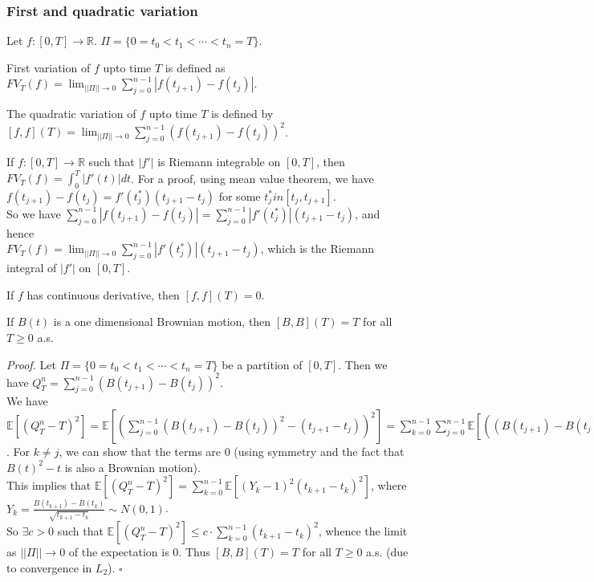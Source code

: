 \documentclass[a4paper]{article}
\newenvironment{proof}{\begin{breakbox}\textit{Proof.}}{\hfill$\square$\end{breakbox}}
\newcommand{\nl}{\vspace{0.2cm}\\}
\newcommand{\R}{\mathbb{R}}
\newcommand{\E}{\mathbb{E}}
\begin{document}
\subsubsection{First and quadratic variation}
Let $f : [0, T] \to \R$. $\Pi = \{0 = t_0 < t_1 < \cdots < t_n = T\}$.\nl
\begin{defn}
    First variation of $f$ upto time $T$ is defined as 
    $FV_T(f) = \lim_{||\Pi|| \to 0} \sum_{j = 0}^{n - 1} |f(t_{j+1}) - f(t_j)|$.
\end{defn}
\begin{defn}
    The quadratic variation of $f$ upto time $T$ is defined by
    $[f, f](T) = \lim_{||\Pi|| \to 0} \sum_{j = 0}^{n - 1} (f(t_{j+1}) - f(t_j))^2$.
\end{defn}
\begin{note}
    If $f : [0, T] \to \R$ such that $|f'|$ is Riemann integrable on $[0, T]$, then $FV_T(f) = \int_0^T |f'(t)| dt$. For a proof, using mean value theorem, we have $f(t_{j+1}) - f(t_j) =
    f'(t_j^*)(t_{j+1} - t_j)$ for some $t_j^* in [t_j, t_{j+1}]$.\nl
    So we have $\sum_{j = 0}^{n - 1} |f(t_{j+1}) - f(t_j)| = \sum_{j = 0}^{n - 1} |f'(t_j^*)| (t_{j+1} - t_j)$, and hence\nl
    $FV_T(f) = \lim_{||\Pi|| \to 0} \sum_{j=0}^{n-1} |f'(t_j^*)| (t_{j+1} - t_j)$, which is the Riemann integral of $|f'|$ on $[0, T]$.
\end{note}
\begin{note}
    If $f$ has continuous derivative, then $[f, f](T) = 0$.
\end{note}

\begin{theorem}
    If $B(t)$ is a one dimensional Brownian motion, then $[B, B](T) = T$ for all $T \ge 0$ a.s.
\end{theorem}
\begin{proof}
    Let $\Pi = \{0 = t_0 < t_1 < \cdots < t_n = T\}$ be a partition of $[0, T]$. Then we have $Q_T^n = \sum_{j=0}^{n-1} (B(t_{j+1}) - B(t_j))^2$.\nl
    We have $\E[(Q_T^n - T)^2] = \E[(\sum_{j=0}^{n-1} (B(t_{j+1}) - B(t_j))^2 - (t_{j+1} - t_j))^2] = \sum_{k=0}^{n-1} \sum_{j=0}^{n-1} \E[((B(t_{j+1}) - B(t_j))^2 - t_{j+1} + t_j) \cdot
    (\text{same thing for k})]$. For $k \ne j$, we can show that the terms are 0 (using symmetry and the fact that $B(t)^2 - t$ is also a Brownian motion).\nl
    This implies that $\E[(Q_T^n - T)^2] = \sum_{k = 0}^{n - 1} \E[(Y_k - 1)^2 (t_{k+1} - t_k)^2]$, where $Y_k = \frac{B(t_{k+1}) - B(t_k)}{\sqrt{t_{k+1} - t_k}} \sim N(0, 1)$.\nl
    So $\exists c > 0$ such that $\E[(Q_T^n - T)^2] \le c \cdot \sum_{k = 0}^{n - 1} (t_{k+1} - t_k)^2$, whence the limit as $||\Pi|| \to 0$ of the expectation is 0. Thus $[B, B](T) = T$ for all
    $T \ge 0$ a.s. (due to convergence in $L_2$).
\end{proof}
\end{document}
